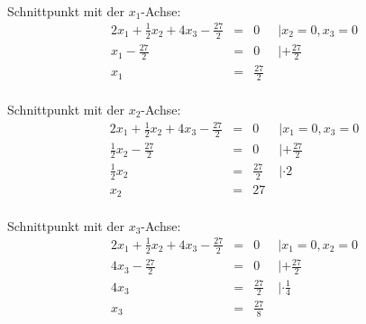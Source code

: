 \documentclass[10pt,a4paper,oneside,ngerman,numbers=noenddot]{scrartcl}
\begin{document}
\\
Schnittpunkt mit der $x_{1}$-Achse:\\
\begin{alignat*}{2}
x_{1} + \frac{1}{2}x_{2} + 4x_{3} - \frac{27}{2} &=& 0 & \;| x_{2} = 0, x_{3} = 0 \\
x_{1} - \frac{27}{2} &=& 0 & \;| + \frac{27}{2} \\
x_{1} &=& \frac{27}{2} &
\end{alignat*}
\\
Schnittpunkt mit der $x_{2}$-Achse:\\
\begin{alignat*}{2}
x_{1} + \frac{1}{2}x_{2} + 4x_{3} - \frac{27}{2} &=& 0 & \;| x_{1} = 0, x_{3} = 0 \\
\frac{1}{2}x_{2} - \frac{27}{2} &=& 0 & \;| + \frac{27}{2} \\
\frac{1}{2}x_{2} &=& \frac{27}{2} & \;| \cdot 2 \\
x_{2} &=& 27 &
\end{alignat*}
\\
Schnittpunkt mit der $x_{3}$-Achse:\\
\begin{alignat*}{2}
x_{1} + \frac{1}{2}x_{2} + 4x_{3} - \frac{27}{2} &=& 0 & \;| x_{1} = 0, x_{2} = 0 \\
4x_{3} - \frac{27}{2} &=& 0 & \;| + \frac{27}{2} \\
4x_{3} &=& \frac{27}{2} & \;| \cdot \frac{1}{4} \\
x_{3} &=& \frac{27}{8} &
\end{alignat*}
\end{document}
